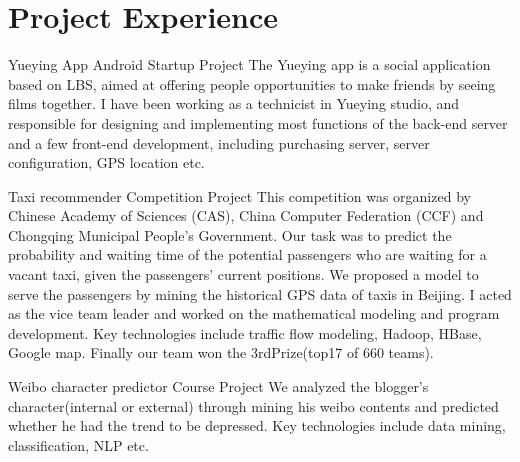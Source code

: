 \documentclass[11pt,a4paper]{moderncv}
\begin{document}
\section{Project Experience}

{Yueying App}
{Android}
{Startup Project}{}
{
The Yueying app is a social application based on LBS, aimed at offering people opportunities to make friends by seeing films together. I have been working as a technicist in Yueying studio, and responsible for designing and implementing most functions of the back-end server and a few front-end development, including purchasing server, server configuration, GPS location etc.
}

\vspace*{0.2\baselineskip}
{Taxi recommender}
{}
{Competition Project}{}
{
This competition was organized by Chinese Academy of Sciences (CAS), China Computer Federation (CCF) and Chongqing Municipal People’s Government. Our task was to predict the probability and waiting time of the potential passengers who are waiting for a vacant taxi, given the passengers’ current positions. We proposed a model to serve the passengers by mining the historical GPS data of taxis in Beijing. I acted as the vice team leader and worked on the mathematical modeling and program development. Key technologies include traffic flow modeling, Hadoop, HBase, Google map. Finally our team won the 3rdPrize(top17 of 660 teams).
}

\vspace*{0.2\baselineskip}
{Weibo character predictor}
{}
{Course Project}{}
{
We analyzed the blogger's character(internal or external) through mining his weibo contents and predicted whether he had the trend to be depressed. Key technologies include data mining, classification, NLP etc.
}




\end{document}
